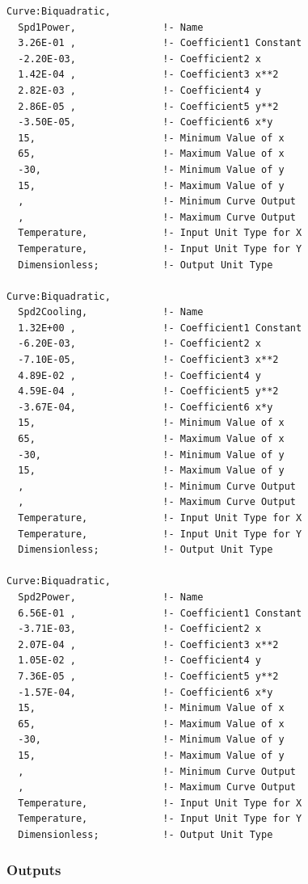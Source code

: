 \begin{lstlisting}
Curve:Biquadratic,
  Spd1Power,               !- Name
  3.26E-01 ,               !- Coefficient1 Constant
  -2.20E-03,               !- Coefficient2 x
  1.42E-04 ,               !- Coefficient3 x**2
  2.82E-03 ,               !- Coefficient4 y
  2.86E-05 ,               !- Coefficient5 y**2
  -3.50E-05,               !- Coefficient6 x*y
  15,                      !- Minimum Value of x
  65,                      !- Maximum Value of x
  -30,                     !- Minimum Value of y
  15,                      !- Maximum Value of y
  ,                        !- Minimum Curve Output
  ,                        !- Maximum Curve Output
  Temperature,             !- Input Unit Type for X
  Temperature,             !- Input Unit Type for Y
  Dimensionless;           !- Output Unit Type

Curve:Biquadratic,
  Spd2Cooling,             !- Name
  1.32E+00 ,               !- Coefficient1 Constant
  -6.20E-03,               !- Coefficient2 x
  -7.10E-05,               !- Coefficient3 x**2
  4.89E-02 ,               !- Coefficient4 y
  4.59E-04 ,               !- Coefficient5 y**2
  -3.67E-04,               !- Coefficient6 x*y
  15,                      !- Minimum Value of x
  65,                      !- Maximum Value of x
  -30,                     !- Minimum Value of y
  15,                      !- Maximum Value of y
  ,                        !- Minimum Curve Output
  ,                        !- Maximum Curve Output
  Temperature,             !- Input Unit Type for X
  Temperature,             !- Input Unit Type for Y
  Dimensionless;           !- Output Unit Type

Curve:Biquadratic,
  Spd2Power,               !- Name
  6.56E-01 ,               !- Coefficient1 Constant
  -3.71E-03,               !- Coefficient2 x
  2.07E-04 ,               !- Coefficient3 x**2
  1.05E-02 ,               !- Coefficient4 y
  7.36E-05 ,               !- Coefficient5 y**2
  -1.57E-04,               !- Coefficient6 x*y
  15,                      !- Minimum Value of x
  65,                      !- Maximum Value of x
  -30,                     !- Minimum Value of y
  15,                      !- Maximum Value of y
  ,                        !- Minimum Curve Output
  ,                        !- Maximum Curve Output
  Temperature,             !- Input Unit Type for X
  Temperature,             !- Input Unit Type for Y
  Dimensionless;           !- Output Unit Type
\end{lstlisting}

\subsubsection{Outputs}

